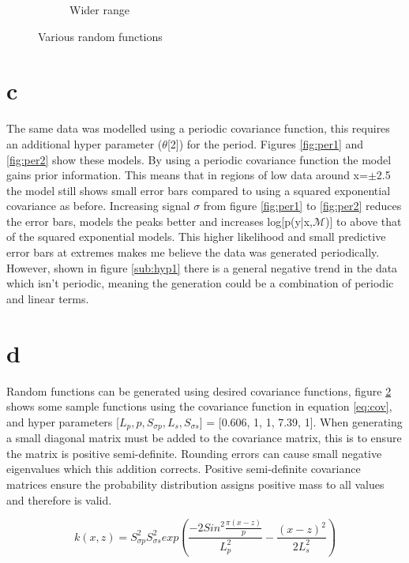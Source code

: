 \documentclass[twoside,twocolumn]{article}
\begin{document}
\begin{figure}[h]
\begin{subfigure}[t]{0.49\linewidth}
        \caption{Wider range}
        \label{sub:r3}
    \end{subfigure}%
    \caption{Various random functions}
    \label{fig:ran}
\end{figure}
\section{c}
The same data was modelled using a periodic covariance function, this requires an additional hyper parameter ($\theta$[2]) for the period. Figures \ref{fig:per1} and \ref{fig:per2} show these models. By using a periodic covariance function the model gains prior information. This means that in regions of low data around x=$\pm$2.5 the model still shows small error bars compared to using a squared exponential covariance as before. Increasing signal $\sigma$ from figure \ref{fig:per1} to \ref{fig:per2} reduces the error bars, models the peaks better and increases log[p(y|x,$\mathcal{M}$)] to above that of the squared exponential models. This higher likelihood and small predictive error bars at extremes makes me believe the data was generated periodically. However, shown in figure \ref{sub:hyp1} there is a general negative trend in the data which isn't periodic, meaning the generation could be a combination of periodic and linear terms.



\section{d}
Random functions can be generated using desired covariance functions, figure \ref{fig:ran} shows some sample functions using the covariance function in equation \ref{eq:cov}, and hyper parameters [$L_p,p,S_{\sigma p},L_s,S_{\sigma s}$] = [0.606, 1, 1, 7.39, 1]. When generating a small diagonal matrix must be added to the covariance matrix, this is to ensure the matrix is positive semi-definite. Rounding errors can cause small negative eigenvalues which this addition corrects. Positive semi-definite covariance matrices ensure the probability distribution assigns positive mass to all values and therefore is valid.

\begin{equation}
k(x,z)= S_{\sigma p}^2S_{\sigma s}^2 exp(\frac{-2Sin^2\frac{\pi(x-z)}{p}}{L_p^2} -\frac{(x-z)^2}{2L_s^2} )
\label{eq:cov}
\end{equation}
\end{document}
